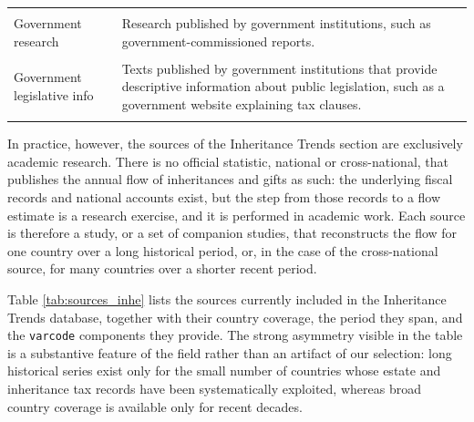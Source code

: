 \documentclass[
]{article}
\begin{document}
\begin{longtable}[t]{>{\raggedright\arraybackslash}p{4cm}>{\raggedright\arraybackslash}p{10cm}}
\cellcolor{gray!10}{Academic research} & \cellcolor{gray!10}{Research published by academic institutions, such as an academic journal article.}\\
Government research & Research published by government institutions, such as government-commissioned reports.\\
\addlinespace
\cellcolor{gray!10}{Government legislation} & \cellcolor{gray!10}{The actual text of public legislation.}\\
Government legislative info & Texts published by government institutions that provide descriptive information about public legislation, such as a government website explaining tax clauses.\\
\cellcolor{gray!10}{Government documents} & \cellcolor{gray!10}{Other texts published by government institutions, such as tax documents, forms, or descriptive reports.}\\
\bottomrule
\end{longtable}

In practice, however, the sources of the Inheritance Trends section are
exclusively academic research. There is no official statistic, national
or cross-national, that publishes the annual flow of inheritances and
gifts as such: the underlying fiscal records and national accounts
exist, but the step from those records to a flow estimate is a research
exercise, and it is performed in academic work. Each source is therefore
a study, or a set of companion studies, that reconstructs the flow for
one country over a long historical period, or, in the case of the
cross-national source, for many countries over a shorter recent period.

Table \ref{tab:sources_inhe} lists the sources currently included in the
Inheritance Trends database, together with their country coverage, the
period they span, and the \texttt{varcode} components they provide. The
strong asymmetry visible in the table is a substantive feature of the
field rather than an artifact of our selection: long historical series
exist only for the small number of countries whose estate and
inheritance tax records have been systematically exploited, whereas
broad country coverage is available only for recent decades.
\end{document}
